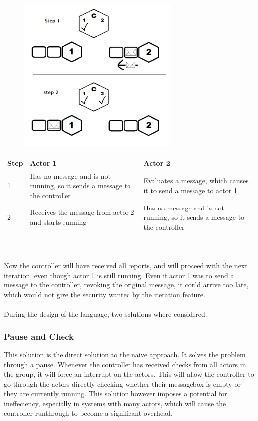 \begin{figure}[htbp]
\centering
\includegraphics[width=0.7\textwidth]{Analysis/Supercomputing/iterationproblem.png}\label{iterationproblem_img}
\end{figure}

\begin{tabular}{ | p{1cm} | p{6cm} | p{6cm} | }%
\hline
Step & Actor 1 & Actor 2 \\\hline
1 & Has no message and is not running, so it sends a message to the controller & Evaluates a message, which causes it to send a message to actor 1 \\\hline
2 & Receives the message from actor 2 and starts running & Has no message and is not running, so it sends a message to the controller \\\hline
\end{tabular} \\\\
Now the controller will have received all reports, and will proceed with the next iteration, even though actor 1 is still running. Even if actor 1 was to send a message to the controller, revoking the original message, it could arrive too late, which would not give the security wanted by the iteration feature.\\\\
During the design of the language, two solutions where considered.

\subsubsection{Pause and Check}

This solution is the direct solution to the naive approach. It solves the problem through a pause. Whenever the controller has received checks from all actors in the group, it will force an interrupt on the actors. This will allow the controller to go through the actors directly checking whether their messagebox is empty or they are currently running. This solution however imposes a potential for ineffeciency, especially in systems with many actors, which will cause the controller runthrough to become a significant overhead.


